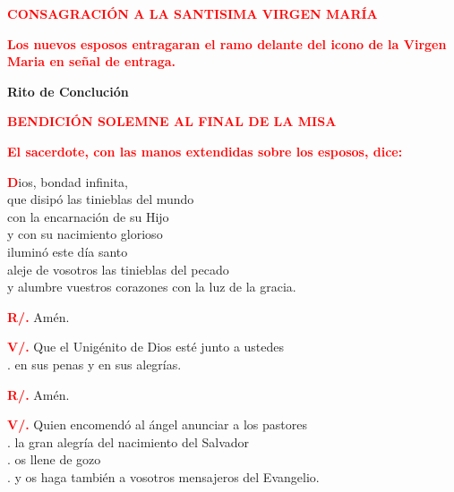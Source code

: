 \documentclass[12pt, letterpaper]{report}
\begin{document}
\Large {\bfseries \textcolor{red}{CONSAGRACI\'ON A LA SANTISIMA VIRGEN MAR\'IA}} \newline

\large{\bfseries \textcolor{red}{Los nuevos esposos entragaran el ramo delante del icono de la Virgen Maria en se\~nal de entraga.}}\newline

\newpage

\begin{center}
\Huge {\bfseries Rito de Concluci\'on}
\end{center}

\Large {\bfseries \textcolor{red}{BENDICI\'ON SOLEMNE AL FINAL DE LA MISA}} \newline

\large{\bfseries \textcolor{red}{El sacerdote, con las manos extendidas sobre los esposos, dice:}}\newline

\lettrine[lines=1]{\bfseries \textcolor{red}{D}}{}\Large ios, bondad infinita, \\
que disip\'o las tinieblas del mundo \\
con la encarnaci\'on de su Hijo \\
y con su nacimiento glorioso \\
ilumin\'o este d\'ia santo \\
aleje de vosotros las tinieblas del pecado \\
y alumbre vuestros corazones con la luz de la gracia. \newline

\Large \hspace{-0.9cm} {\bfseries \textcolor{red}{R/.}} \hspace{0.5cm} Am\'en.\newline

\Large \hspace{-0.9cm} {\bfseries \textcolor{red}{V/.}} \hspace{0.5cm} Que el Unig\'enito de Dios est\'e junto a ustedes \\
. \hspace{1cm} en sus penas y en sus alegr\'ias. \newline

\Large \hspace{-0.9cm} {\bfseries \textcolor{red}{R/.}} \hspace{0.5cm} Am\'en.\newline

\Large \hspace{-0.9cm} {\bfseries \textcolor{red}{V/.}} \hspace{0.5cm} Quien encomend\'o al \'angel anunciar a los pastores \\
. \hspace{1cm} la gran alegr\'ia del nacimiento del Salvador \\
. \hspace{1cm} os llene de gozo \\
. \hspace{1cm} y os haga tambi\'en a vosotros mensajeros del Evangelio. \newline
\end{document}

